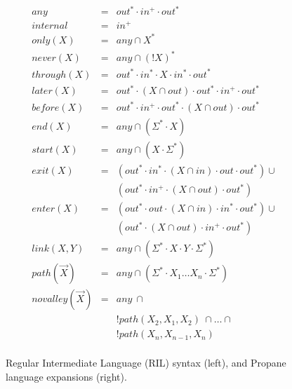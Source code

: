 \begin{figure}
\begin{minipage}[t]{.45\linewidth}
  \end{minipage}
  ~~
  \vrule
  ~~
  \begin{minipage}[t]{.5\linewidth}
  \vspace*{-1\baselineskip}
  \[ \begin{array}{rcl}
    \hline
    any           & = & out^* \cdot in^+ \cdot out^* \\
    internal      & = & in^+ \\
    only(X)       & = & any \cap X^* \\
    never(X)      & = & any \cap (!X)^* \\
    through(X)    & = & out^* \cdot in^* \cdot X \cdot in^* \cdot out^* \\
    later(X)      & = & out^* \cdot (X \cap out) \cdot out^* \cdot in^+ \cdot out^* \\
    before(X)     & = & out^* \cdot in^+ \cdot out^* \cdot (X \cap out) \cdot out^* \\
    end(X)        & = & any \cap (\Sigma^* \cdot X) \\
    start(X)      & = & any \cap (X \cdot \Sigma^*) \\
    exit(X)       & = & (out^* \cdot in^* \cdot (X \cap in) \cdot out \cdot out^*) \cup \\
                  &        & (out^* \cdot in^+ \cdot (X \cap out) \cdot out^*) \\
    enter(X)      & = & (out^* \cdot out \cdot (X \cap in) \cdot in^* \cdot out^*) \cup \\
                  &        & (out^* \cdot (X \cap out) \cdot in^+ \cdot out^*) \\
    link(X,Y)     & = & any \cap (\Sigma^* \cdot X \cdot Y \cdot \Sigma^*) \\
    path(\vec{X}) & = & any \cap (\Sigma^* \cdot X_1 \dots X_n \cdot \Sigma^*) \\
    novalley(\vec{X}) & = & any ~ \cap \\
                  &   & !path(X_2,X_1,X_2) ~ \cap \dots \cap \\
                  &   & !path(X_n,X_{n-1},X_n) \\
  \end{array} \]

  \end{minipage}

  \hrulefill

  \caption{Regular Intermediate Language (RIL) syntax (left), and
           Propane language expansions (right).}
  \label{fig:rir-syntax}
\end{figure}


